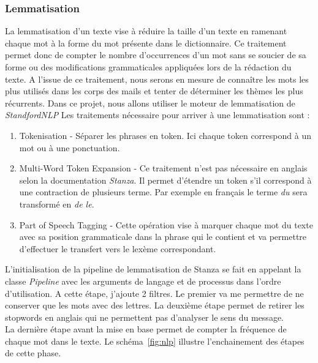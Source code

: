     \subsubsection{Lemmatisation}
        La lemmatisation d'un texte vise à réduire la taille d'un texte en ramenant chaque mot à la forme du mot présente dans le dictionnaire.
        Ce traitement permet donc de compter le nombre d'occurrences d'un mot sans se soucier de sa forme ou des modifications grammaticales appliquées lors de la rédaction du texte.
        A l'issue de ce traitement, nous serons en mesure de connaître les mots les plus utilisés dans les corps des mails et tenter de déterminer les thèmes les plus récurrents.
        Dans ce projet, nous allons utiliser le moteur de lemmatisation de \emph{StandfordNLP}\cite{manning-EtAl:2014:P14-5}\cite{qi2020stanza}
        Les traitements nécessaire pour arriver à une lemmatisation sont :
        \begin{enumerate}
            \item Tokenisation - Séparer les phrases en token. Ici chaque token correspond à un mot ou à une ponctuation.
            \item Multi-Word Token Expansion - Ce traitement n'est pas nécessaire en anglais selon la documentation \emph{Stanza}. Il permet d'étendre un token s'il correspond à une contraction de plusieurs terme. Par exemple en français le terme \emph{du} sera transformé en \emph{de le}.
            \item Part of Speech Tagging - Cette opération vise à marquer chaque mot du texte avec sa position grammaticale dans la phrase qui le contient et va permettre d'effectuer le transfert vers le lexème correspondant.
        \end{enumerate}

        L'initialisation de la pipeline de lemmatisation de Stanza se fait en appelant la classe \emph{Pipeline} avec les arguments de langage et de processus dans l'ordre d'utilisation.
        A cette étape, j'ajoute 2 filtres.
        Le premier va me permettre de ne conserver que les mots avec des lettres.
        La deuxième étape permet de retirer les stopwords en anglais qui ne permettent pas d'analyser le sens du message.\\
        La dernière étape avant la mise en base permet de compter la fréquence de chaque mot dans le texte.
        Le schéma~\ref{fig:nlp} illustre l'enchainement des étapes de cette phase.

